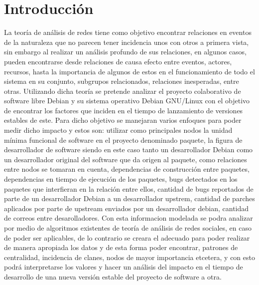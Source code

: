 \documentclass[12pt]{report}
\begin{document}
\chapter*{Introducción}
La  teoría  de  análisis  de   redes  tiene  como  objetivo  encontrar
relaciones en eventos de la naturaleza que no parecen tener incidencia
unos con  otros a primera vista,  sin embargo al realizar  un análisis
profundo de sus relaciones, en algunos casos, pueden encontrarse desde
relaciones de causa efecto entre  eventos, actores, recursos, hasta la
importancia  de algunos  de  estos  en el  funcionamiento  de todo  el
sistema   en   su   conjunto,   subgrupos   relacionados,   relaciones
inesperadas, entre otras. Utilizando dicha teoría se pretende analizar
el  proyecto  colaborativo  de  software libre  Debian  y  su  sistema
operativo Debian GNU/Linux  con el objetivo de  encontrar los factores
que  inciden en  el tiempo  de  lanzamiento de  versiones estables  de
este.  Para dicho  objetivo se  manejaran varios  enfoques para  poder
medir dicho  impacto y estos  son: utilizar como principales  nodos la
unidad mínima funcional de software en el proyecto denominado paquete,
la figura  de desarrollador de software  siendo en este caso  tanto un
desarrollador Debian  como un desarrollador original  del software que
da  origen al  paquete,  como  relaciones entre  nodos  se tomaran  en
cuenta, dependencias  de construcción entre paquetes,  dependencias en
tiempo de ejecución  de los paquetes, bugs detectados  en los paquetes
que  interfieran  en  la  relación   entre  ellos,  cantidad  de  bugs
reportados  de parte  de un  desarrollador Debian  a un  desarrollador
upstrem, cantidad de parches aplicados  por parte de upstream enviados
por   un    desarrollador   debian,   cantidad   de    correos   entre
desarolladores. Con  esta informacion  modelada se podra  analizar por
medio  de  algoritmos  existentes  de  teoría  de  análisis  de  redes
sociales, en caso  de poder ser aplicables, de lo  contrario se creara
el adecuado  para poder realizar  de manera  apropiada los datos  y de
esta  forma poder  encontrar, patrones  de centralidad,  incidencia de
clanes,  nodos  de  mayor  importancia  etcetera,  y  con  esto  podrá
interpretarse los valores y hacer un análisis del impacto en el tiempo
de desarrollo de una nueva versión  estable del proyecto de software a
otra.
\end{document}
